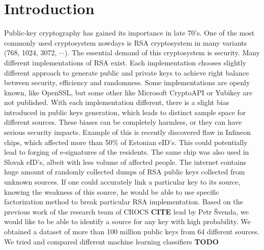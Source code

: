 \chapter*{Introduction}

Public-key cryptography has gained its importance in late 70's. One of the most commonly used cryptosystem nowdays is RSA cryptosystem in many variants (768, 1024, 3072, $\cdots$). The essential demand of this cryptosystem is security. Many different implementations of RSA exist. Each implementation chooses slightly different approach to generate public and private keys to achieve right balance between security, efficiency and randomness. Some implementations are openly known, like OpenSSL, but some other like Microsoft CryptoAPI or Yubikey are not published. With each implementation different, there is a slight bias introduced in public keys generation, which leads to distinct sample space for different sources. These biases can be completely harmless, or they can have serious security impacts. Example of this is recently discovered flaw in Infineon chips, which affected more than 50\% of Estonian eID's. This could potentially lead to forging of e-signatures of the residents. The same chip was also used in Slovak eID's, albeit with less volume of affected people.
The internet contains huge amount of randomly collected dumps of RSA public keys collected from unknown sources. If one could accurately link a particular key to its source, knowing the weakness of this source, he would be able to use specific factorization method to break particular RSA implementation.
Based on the previous work of the research team of CROCS \textbf{CITE} lead by Petr Švenda, we would like to be able to identify a source for any key with high probability. We obtained a dataset of more than 100 million public keys from 64 different sources. We tried and compared different machine learning classifiers \textbf{TODO}

